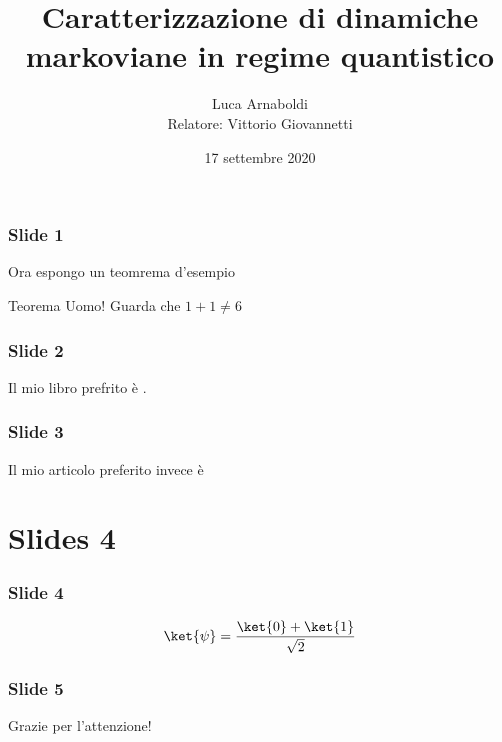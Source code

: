 \documentclass{beamer}
\title[Caratteriz. di dinamiche markoviane in regime quantistico]
      {Caratterizzazione di dinamiche markoviane in regime quantistico}
\author[Luca Arnaboldi]{Luca Arnaboldi \\[1ex]
	{\small Relatore: Vittorio Giovannetti}}
\institute[UniPi]{\texttt{[image: img/unipi.png]}}
\date[17-09-2020]{17 settembre 2020}
\begin{document}
	
\frame{\titlepage}

\begin{frame}
	\frametitle[Slide 1]{Slide 1}
	Ora espongo un teomrema d'esempio \pause
	\begin{block}{Teorema}
		Uomo! Guarda che \(1+1 \not= 6\)
	\end{block}
\end{frame}

\begin{frame}
\frametitle[Slide 2]{Slide 2}
Il mio libro prefrito è \cite{nielsen2010quantum}.
\end{frame}

\begin{frame}
\frametitle[Slide 3]{Slide 3}
Il mio articolo preferito invece è \cite{CPdoesnotimply}
\end{frame}

\section{Slides 4}
\begin{frame}
\frametitle{Slide 4}
\begin{figure}

\end{figure}
\begin{equation}
\ket{\psi} = \frac{\ket{0}+\ket{1}}{\sqrt{2}}
\end{equation}
\end{frame}

\begin{frame}
\frametitle[Slide 5]{Slide 5}
\end{frame}

\begin{frame}

\centerline{\huge Grazie per l'attenzione!} 

\vfill
\textbf{}
\printbibliography
\centerline{\resizebox{0.5cm}{!}{}}

\end{frame}
\end{document}
